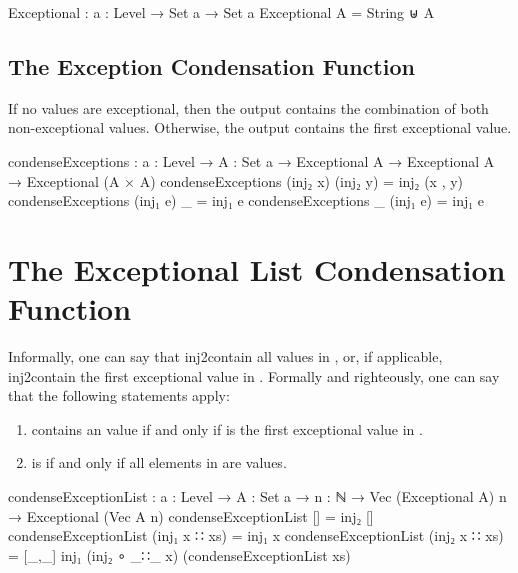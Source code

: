 \documentclass{report}
\begin{document}
\begin{code}
Exceptional : {a : Level} → Set a → Set a
Exceptional A = String ⊎ A
\end{code}

\subsection{The Exception Condensation Function}
If no values are exceptional, then the output contains the combination of both non-exceptional values.  Otherwise, the output contains the first exceptional value.

\begin{code}
condenseExceptions : {a : Level} →
                     {A : Set a} →
                     Exceptional A →
                     Exceptional A →
                     Exceptional (A × A)
condenseExceptions (inj₂ x) (inj₂ y) = inj₂ (x , y)
condenseExceptions (inj₁ e) _ = inj₁ e
condenseExceptions _ (inj₁ e) = inj₁ e
\end{code}

\section{The Exceptional List Condensation Function}
Informally, one can say that   \gls{inj2contain} all values in , or, if applicable,   \gls{inj2contain} the first exceptional value in .  Formally and righteously, one can say that the following statements apply:

\begin{enumerate}
  \item {}  contains an  value if and only if   is the first exceptional value in .\label{enum:condenseExceptionList-inj1}
  \item {}  is   if and only if all elements in  are  values.\label{enum:condenseExceptionList-inj2}
\end{enumerate}

\begin{code}
condenseExceptionList :
  {a : Level} →
  {A : Set a} →
  {n : ℕ} →
  Vec (Exceptional A) n →
  Exceptional (Vec A n)
condenseExceptionList [] = inj₂ []
condenseExceptionList (inj₁ x ∷ xs) = inj₁ x
condenseExceptionList (inj₂ x ∷ xs) =
  [_,_] inj₁ (inj₂ ∘ _∷_ x) (condenseExceptionList xs)
\end{code}
\end{document}
